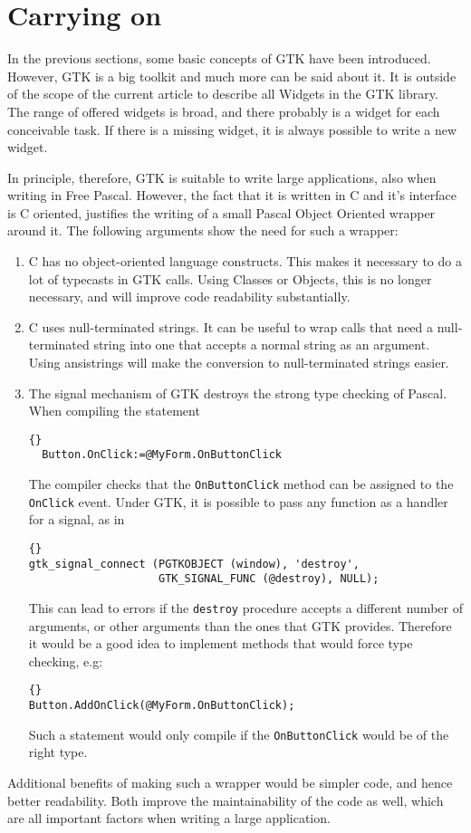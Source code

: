\documentclass[10pt]{article}
\begin{document}
\section{Carrying on}
In the previous sections, some basic concepts of GTK have been introduced.
However, GTK is a big toolkit and much more can be said about it. It is
outside of the scope of the current article to describe all Widgets in the
GTK library. The range of offered widgets is broad, and there probably is a
widget for each conceivable task. If there is a missing widget, it is always
possible to write a new widget. 

In principle, therefore, GTK is suitable to write large applications, also
when writing in Free Pascal. However, the fact that it is written in C and 
it's interface is C oriented, justifies the writing of a small Pascal Object 
Oriented wrapper around it. 
The following arguments show the need for such a wrapper:
\begin{enumerate}
\item C has no object-oriented language constructs. This makes it necessary
to do a lot of typecasts in GTK calls. Using Classes or Objects, this is no
longer necessary, and will improve code readability substantially.
\item C uses null-terminated strings. It can be useful to wrap calls that
need a null-terminated string into one that accepts a normal string as an
argument. Using ansistrings will make the conversion to null-terminated
strings easier.
\item The signal mechanism of GTK destroys the strong type checking of
Pascal. When compiling the statement 
\begin{lstlisting}{}
  Button.OnClick:=@MyForm.OnButtonClick
\end{lstlisting}
The compiler checks that the \lstinline|OnButtonClick| method can be
assigned to the \lstinline|OnClick| event. Under GTK, it is possible
to pass any function as a handler for a signal, as in
\begin{lstlisting}{}
gtk_signal_connect (PGTKOBJECT (window), 'destroy',
                    GTK_SIGNAL_FUNC (@destroy), NULL);
\end{lstlisting}
This can lead to errors if the \lstinline|destroy| procedure accepts a
different number of arguments, or other arguments than the ones that 
GTK provides. Therefore it would be a good idea to implement methods that
would force type checking, e.g:
\begin{lstlisting}{}
Button.AddOnClick(@MyForm.OnButtonClick);
\end{lstlisting}
Such a statement would only compile if the \lstinline|OnButtonClick| would
be of the right type.
\end{enumerate}
Additional benefits of making such a wrapper would be simpler code, and
hence better readability. Both improve the maintainability of the code as well,
which are all important factors when writing a large application.
\end{document}
